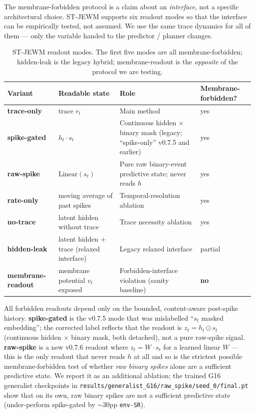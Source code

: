 \documentclass{article}
\begin{document}
The membrane-forbidden protocol is a claim about an \emph{interface}, not a specific architectural choice. ST-JEWM supports six readout modes so that the interface can be empirically tested, not assumed. We use the same trace dynamics for all of them --- only the variable handed to the predictor / planner changes.

\begin{table}[ht]
\centering
\small
\begin{tabular}{llll}
\toprule
Variant & Readable state & Role & Membrane-forbidden? \\
\midrule
\textbf{trace-only}      & trace $r_t$                                 & Main method                                       & yes \\
\textbf{spike-gated}     & $h_t \cdot s_t$                              & Continuous hidden $\times$ binary mask (legacy; ``spike-only'' v0.7.5 and earlier) & yes \\
\textbf{raw-spike}       & $\mathrm{Linear}(s_t)$                       & Pure raw binary-event predictive state; never reads $h$ & yes \\
\textbf{rate-only}       & moving average of past spikes                & Temporal-resolution ablation                      & yes \\
\textbf{no-trace}        & latent hidden without trace                  & Trace necessity ablation                          & yes \\
\textbf{hidden-leak}     & latent hidden + trace (relaxed interface)    & Legacy relaxed interface                          & partial \\
\textbf{membrane-readout} & membrane potential $v_t$ exposed           & Forbidden-interface violation (sanity baseline)   & \textbf{no} \\
\bottomrule
\end{tabular}
\caption{ST-JEWM readout modes. The first five modes are all membrane-forbidden; hidden-leak is the legacy hybrid; membrane-readout is the \emph{opposite} of the protocol we are testing.}
\label{tab:readouts}
\end{table}

All forbidden readouts depend only on the bounded, content-aware post-spike history. \textbf{spike-gated} is the v0.7.5 mode that was mislabelled ``$s_t$ masked embedding''; the corrected label reflects that the readout is $z_t = h_t \odot s_t$ (continuous hidden $\times$ binary mask, both detached), not a pure raw-spike signal. \textbf{raw-spike} is a new v0.7.6 readout where $z_t = W \cdot s_t$ for a learned linear $W$ --- this is the only readout that never reads $h$ at all and so is the strictest possible membrane-forbidden test of whether \emph{raw binary spikes} alone are a sufficient predictive state. We report it as an additional ablation; the trained G16 generalist checkpoints in \texttt{results/generalist\_G16/raw\_spike/seed\_0/final.pt} show that on its own, raw binary spikes are not a sufficient predictive state (under-perform spike-gated by $\sim$30pp \texttt{env-SR}).
\end{document}

